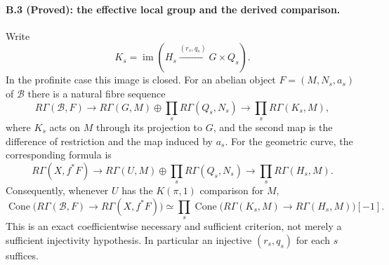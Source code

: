 \paragraph{B.3 (Proved): the effective local group and the derived comparison.}\label{B3}
Write
\[
 K_s=\operatorname{im}(H_s\xrightarrow{(r_s,q_s)}G\times Q_s).
\]
In the profinite case this image is closed. For an abelian object
$F=(M,N_s,a_s)$ of $\mathcal B$ there is a natural fibre sequence
\begin{equation}\label{eq:B-effective}
 R\Gamma(\mathcal B,F)\longrightarrow
 R\Gamma(G,M)\oplus\prod_sR\Gamma(Q_s,N_s)
 \longrightarrow\prod_sR\Gamma(K_s,M),
\end{equation}
where $K_s$ acts on $M$ through its projection to $G$, and the second
map is the difference of restriction and the map induced by $a_s$.
For the geometric curve, the corresponding formula is
\begin{equation}\label{eq:B-geometric}
 R\Gamma(X,f^*F)\longrightarrow
 R\Gamma(U,M)\oplus\prod_sR\Gamma(Q_s,N_s)
 \longrightarrow\prod_sR\Gamma(H_s,M).
\end{equation}
Consequently, whenever $U$ has the $K(\pi,1)$ comparison for $M$,
\begin{equation}\label{eq:B-defect}
 \operatorname{Cone}\bigl(R\Gamma(\mathcal B,F)\to R\Gamma(X,f^*F)\bigr)
 \simeq
 \prod_s\operatorname{Cone}\bigl(R\Gamma(K_s,M)\to R\Gamma(H_s,M)\bigr)[-1].
\end{equation}
This is an exact coefficientwise necessary and sufficient criterion,
not merely a sufficient injectivity hypothesis. In particular an
injective $(r_s,q_s)$ for each $s$ suffices.

